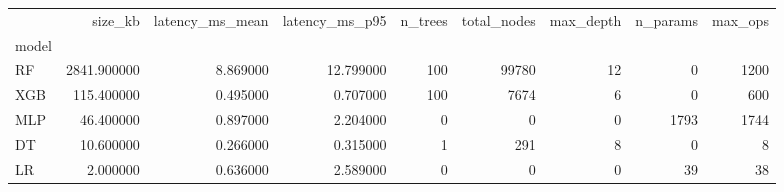 \begin{tabular}{lrrrrrrrr}
\toprule
 & size_kb & latency_ms_mean & latency_ms_p95 & n_trees & total_nodes & max_depth & n_params & max_ops \\
model &  &  &  &  &  &  &  &  \\
\midrule
RF & 2841.900000 & 8.869000 & 12.799000 & 100 & 99780 & 12 & 0 & 1200 \\
XGB & 115.400000 & 0.495000 & 0.707000 & 100 & 7674 & 6 & 0 & 600 \\
MLP & 46.400000 & 0.897000 & 2.204000 & 0 & 0 & 0 & 1793 & 1744 \\
DT & 10.600000 & 0.266000 & 0.315000 & 1 & 291 & 8 & 0 & 8 \\
LR & 2.000000 & 0.636000 & 2.589000 & 0 & 0 & 0 & 39 & 38 \\
\bottomrule
\end{tabular}
